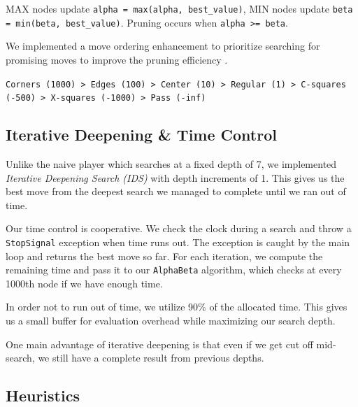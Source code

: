 \documentclass[10pt, titlepage, oneside, a4paper]{article}
\begin{document}
MAX nodes update \texttt{alpha = max(alpha, best\_value)}, MIN nodes update \texttt{beta = min(beta, best\_value)}. Pruning occurs when \texttt{alpha >= beta}.

We implemented a move ordering enhancement to prioritize searching for promising moves to improve the pruning efficiency \textcite{russell2020artificial}. 

\texttt{Corners (1000) > Edges (100) > Center (10) > Regular (1) > C-squares (-500) > X-squares (-1000) > Pass (-inf)}

\subsection{Iterative Deepening \& Time Control}
Unlike the naive player which searches at a fixed depth of 7, we implemented 
\textit{Iterative Deepening Search (IDS)} with depth increments of 1. 
This gives us the best move from the deepest search we managed to complete 
until we ran out of time.

Our time control is cooperative. We check the clock during a search and throw 
a \texttt{StopSignal} exception when time runs out. The exception is caught by 
the main loop and returns the best move so far. For each iteration, we compute 
the remaining time and pass it to our \texttt{AlphaBeta} algorithm, which checks 
at every 1000th node if we have enough time.

In order not to run out of time, we utilize 90\% of the allocated time. 
This gives us a small buffer for evaluation overhead while maximizing our 
search depth.

One main advantage of iterative deepening is that even if we get cut off 
mid-search, we still have a complete result from previous depths.




\subsection{Heuristics}
\end{document}
